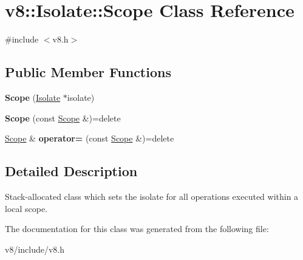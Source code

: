 \hypertarget{classv8_1_1Isolate_1_1Scope}{}\section{v8\+:\+:Isolate\+:\+:Scope Class Reference}
\label{classv8_1_1Isolate_1_1Scope}


{\ttfamily \#include $<$v8.\+h$>$}

\subsection*{Public Member Functions}
\begin{DoxyCompactItemize}
\item 
\mbox{\label{classv8_1_1Isolate_1_1Scope_a43889336478a5625e095c4444b9dd684}} 
{\bfseries Scope} (\mbox{\hyperlink{classv8_1_1Isolate}{Isolate}} $\ast$isolate)
\item 
\mbox{\label{classv8_1_1Isolate_1_1Scope_a60cd70c0cf9bb4d65a6ff9fb4719ccde}} 
{\bfseries Scope} (const \mbox{\hyperlink{classv8_1_1Isolate_1_1Scope}{Scope}} \&)=delete
\item 
\mbox{\label{classv8_1_1Isolate_1_1Scope_ad555a0b481e05f004f48beb346025d82}} 
\mbox{\hyperlink{classv8_1_1Isolate_1_1Scope}{Scope}} \& {\bfseries operator=} (const \mbox{\hyperlink{classv8_1_1Isolate_1_1Scope}{Scope}} \&)=delete
\end{DoxyCompactItemize}


\subsection{Detailed Description}
Stack-\/allocated class which sets the isolate for all operations executed within a local scope. 

The documentation for this class was generated from the following file\+:\begin{DoxyCompactItemize}
\item 
v8/include/v8.\+h\end{DoxyCompactItemize}
